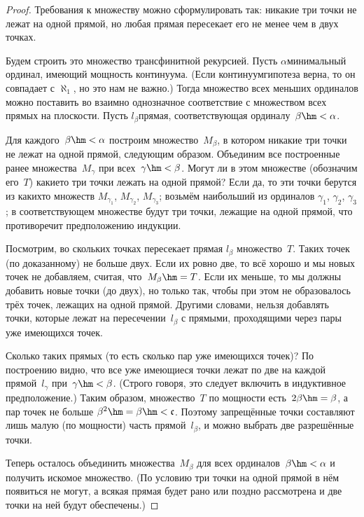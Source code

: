 \begin{proof}
Требования к множеству можно сформулировать так: никакие
три точки не лежат на одной прямой, но любая прямая
пересекает его не менее чем в двух точках.

Будем строить это множество трансфинитной рекурсией. Пусть
$\alpha$\т минимальный ординал, имеющий мощность континуума.
(Если континуум\д гипотеза верна,
то он совпадает с $\aleph_1$,
но это нам не важно.) Тогда множество всех меньших ординалов
можно поставить во взаимно однозначное соответствие с
множеством всех прямых на плоскости. Пусть $l_{\beta}$\т прямая,
соответствующая ординалу~$\beta\hm<\alpha$.

Для каждого~$\beta\hm<\alpha$ построим множество~$M_{\beta}$, в
котором никакие три точки не лежат на одной прямой, следующим
образом. Объединим все построенные ранее множества~$M_{\gamma}$
при всех~$\gamma\hm<\beta$. Могут ли в этом множестве (обозначим
его~$T$) какие\д то три точки лежать на одной прямой? Если да,
то эти точки берутся из каких\д то множеств $M_{\gamma_1}$, $M_{\gamma_2}$,
$M_{\gamma_3}$; возьмём наибольший из ординалов
$\gamma_1$, $\gamma_2$, $\gamma_3$; в соответствующем множестве будут
три точки, лежащие на одной прямой, что противоречит
предположению индукции.

Посмотрим, во скольких точках пересекает прямая $l_{\beta}$
множество~$T$. Таких точек (по доказанному) не больше двух.
Если их ровно две, то всё хорошо и мы новых точек не добавляем,
считая, что~$M_{\beta}\hm=T$. Если их меньше, то мы должны
добавить новые точки (до двух), но только так, чтобы
при этом не образовалось трёх точек, лежащих на одной прямой.
Другими словами, нельзя добавлять точки, которые лежат на
пересечении~$l_{\beta}$ с прямыми, проходящими через пары
уже имеющихся точек.

Сколько таких прямых (то есть сколько пар уже имеющихся точек)?
По построению видно, что все уже имеющиеся точки лежат по две на
каждой прямой~$l_{\gamma}$ при~$\gamma\hm<\beta$. (Строго говоря,
это следует включить в индуктивное предположение.) Таким
образом, множество~$T$ по мощности есть~$2\beta\hm=\beta$, а пар
точек не больше $\beta^2\hm=\beta\hm<\mathfrak{c}$. Поэтому
запрещённые точки
составляют лишь малую (по мощности) часть прямой~$l_{\beta}$, и
можно выбрать две разрешённые точки.

Теперь осталось объединить множества~$M_{\beta}$ для всех
ординалов~$\beta\hm<\alpha$ и получить искомое множество. (По
условию три точки на одной прямой в нём появиться не могут, а
всякая прямая будет рано или поздно рассмотрена и две точки на
ней будут обеспечены.)
\end{proof}

